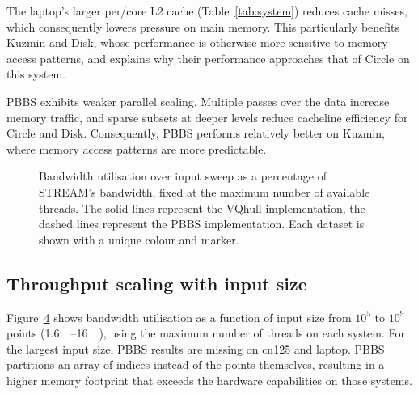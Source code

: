 The laptop's larger per\-/core L2 cache (Table~\ref{tab:system}) reduces cache misses, which consequently lowers pressure on main memory.
This particularly benefits Kuzmin and Disk, whose performance is otherwise more sensitive to memory access patterns, and explains why their performance approaches that of Circle on this system.

PBBS exhibits weaker parallel scaling.
Multiple passes over the data increase memory traffic, and sparse subsets at deeper levels reduce cacheline efficiency for Circle and Disk.
Consequently, PBBS performs relatively better on Kuzmin, where memory access patterns are more predictable.

\begin{figure}[t]
  \scriptsize
  \begin{subfigure}[b]{0.33\linewidth}
    \centering
    \label{fig:points-cn125}%
  \end{subfigure}%
  \hfill
  \begin{subfigure}[b]{0.33\linewidth}
    \centering
    \label{fig:points-cn132}%
  \end{subfigure}%
  \hfill
  \begin{subfigure}[b]{0.33\linewidth}
    \centering
    \label{fig:points-laptop}%
  \end{subfigure}%
  \caption{Bandwidth utilisation over input sweep as a percentage of STREAM's bandwidth, fixed at the maximum number of available threads.
  The solid lines represent the VQhull implementation, the dashed lines represent the PBBS implementation.
  Each dataset is shown with a unique colour and marker.}%
  \label{fig:points}%
\end{figure}

\subsection{Throughput scaling with input size}
Figure~\ref{fig:points} shows bandwidth utilisation as a function of input size from $10^5$ to $10^9$ points (\qty{1.6}{\mega\byte}--\qty{16}{\giga\byte}), using the maximum number of threads on each system.
For the largest input size, PBBS results are missing on cn125 and laptop.
PBBS partitions an array of indices instead of the points themselves, resulting in a higher memory footprint that exceeds the hardware capabilities on those systems.

